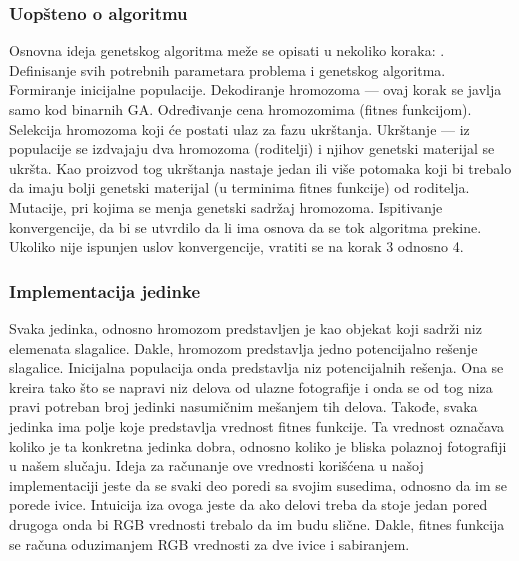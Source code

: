 \documentclass{article}
\begin{document}
\subsubsection{Uopšteno o algoritmu}
Osnovna ideja genetskog algoritma meže se opisati u nekoliko koraka:\newline
{}. Definisanje svih potrebnih parametara problema i genetskog algoritma. Formiranje inicijalne populacije. Dekodiranje hromozoma — ovaj korak se javlja samo kod binarnih GA. Određivanje cena hromozomima (fitnes funkcijom). Selekcija hromozoma koji će postati ulaz za fazu ukrštanja. Ukrštanje — iz populacije se izdvajaju dva hromozoma (roditelji) i njihov genetski materijal se ukršta. Kao proizvod tog ukrštanja nastaje jedan ili više potomaka koji bi trebalo da imaju bolji genetski materijal (u terminima fitnes funkcije) od roditelja. Mutacije, pri kojima se menja genetski sadržaj hromozoma. Ispitivanje konvergencije, da bi se utvrdilo da li ima osnova da se tok algoritma prekine. Ukoliko nije ispunjen uslov konvergencije, vratiti se na korak 3 odnosno 4.\newline


\subsubsection{Implementacija jedinke}
Svaka jedinka, odnosno hromozom predstavljen je kao objekat koji sadrži niz elemenata slagalice. Dakle, hromozom predstavlja jedno potencijalno rešenje slagalice. Inicijalna populacija onda predstavlja niz potencijalnih rešenja. Ona se kreira tako što se napravi niz delova od ulazne fotografije i onda se od tog niza pravi potreban broj jedinki nasumičnim mešanjem tih delova.\newpage
Takođe, svaka jedinka ima polje koje predstavlja vrednost fitnes funkcije. Ta vrednost označava koliko je ta konkretna jedinka dobra, odnosno koliko je bliska polaznoj fotografiji u našem slučaju. Ideja za računanje ove vrednosti korišćena u našoj implementaciji jeste da se svaki deo poredi sa svojim susedima, odnosno da im se porede ivice. Intuicija iza ovoga jeste da ako delovi treba da stoje jedan pored drugoga onda bi RGB vrednosti trebalo da im budu slične. Dakle, fitnes funkcija se računa oduzimanjem RGB vrednosti za dve ivice i sabiranjem.\newline
\end{document}
